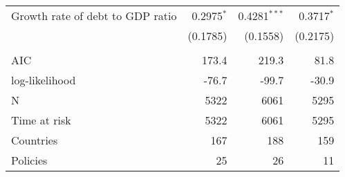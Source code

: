 \begin{tabular}{lrrr}
Growth rate of debt to GDP ratio &      0.2975$^{*}$ &  0.4281$^{* * *}$ &      0.3717$^{*}$ \\
                                 &          (0.1785) &          (0.1558) &          (0.2175) \\
                                 &                   &                   &                   \\
AIC                              &             173.4 &             219.3 &              81.8 \\
log-likelihood                   &             -76.7 &             -99.7 &             -30.9 \\
N                                &              5322 &              6061 &              5295 \\
Time at risk                     &              5322 &              6061 &              5295 \\
Countries                        &               167 &               188 &               159 \\
Policies                         &                25 &                26 &                11 \\
\bottomrule
\end{tabular}
